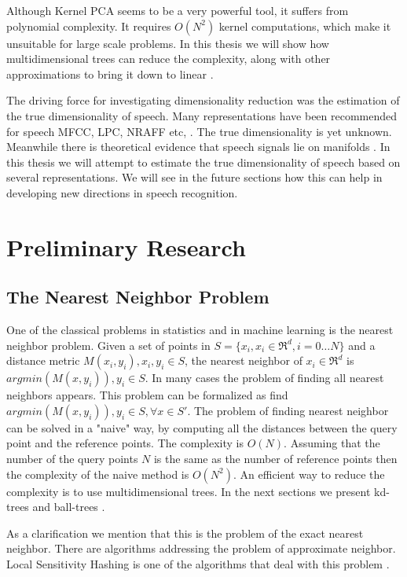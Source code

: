 \documentclass[12pt,letterpaper,doublespaced,ETD,dvips,proposal]{gtthesis}
\begin{document}
\begin{Body}
Although Kernel PCA  seems to be a very powerful tool, it suffers from
polynomial complexity. It requires $O(N^2)$ kernel computations,
which make it unsuitable for large scale problems. In this thesis we
will show how  multidimensional trees can reduce
the complexity, along with other approximations to bring it down to
linear \cite{gray2000nbp}.

The driving force for investigating dimensionality reduction was the
estimation of the true dimensionality of speech. Many representations
have been recommended for speech MFCC, LPC, NRAFF etc, \cite{quatieri2002dts,rabiner1978dps, ravindran:inr}. The true
dimensionality is yet unknown. Meanwhile there is theoretical evidence
that speech signals lie on manifolds
\cite{alder1991dss, sciamarella1999tsc, kumar1990ade, tishby1990dsa, jansen2006ifa}. In
this thesis we will attempt to estimate the true dimensionality of
speech based on several representations. We will see in the future
sections how this can help in developing new directions in speech
recognition.

\section{Preliminary Research}
\label{prelim}
\subsection{The Nearest Neighbor Problem}
\label{The_Nearest_Neighbor_Problem}

One of the classical problems in statistics and in machine learning
is the nearest neighbor problem. Given a set of points in $S =
\{x_i, x_i\in\Re^d, i=0\dots N\}$ and a distance metric $M(x_i, y_i),
x_i, y_i \in S$,  the nearest neighbor of $x_i \in \Re^d$ is
$argmin(M(x, y_i)), y_i \in S$. In many cases the problem of finding
all nearest neighbors appears. This problem can be formalized as
find $argmin(M(x, y_i)), y_i \in S, \forall x \in S'$. The problem
of finding nearest neighbor can be solved in a "naive" way, by
computing all the distances between the query point and the
reference points. The complexity is $O(N)$. Assuming that the number
of the query points $N$ is the same as the number of reference
points then the complexity of the naive method is $O(N^2)$. An
efficient way to reduce the complexity is to use multidimensional
trees. In the next sections we present kd-trees \cite{moore-tutorial}
and ball-trees \cite{moore2000ahu}.

As a clarification we mention that this is the problem of the exact
nearest neighbor. There are algorithms addressing the problem of
approximate neighbor. Local Sensitivity Hashing is one of the
algorithms that deal with this problem \cite{datar2004lsh}.


\end{Body}
\end{document}
